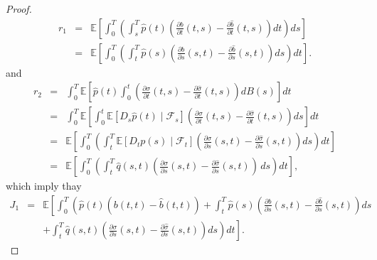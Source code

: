 \documentclass[12pt]{article}
\theoremstyle{remark}
\numberwithin{equation}{section}
\def\E{\mathbb E}
\def\E{\mathbb E}
\begin{document}
\begin{proof}
\begin{eqnarray}\label{Eq003}
	r_1 &=&\mathbb{E}\left[ \int_0^T \left( \int_s^T \hat{p}(t) \left(\frac{\partial
		b}{\partial t }(t, s) -\frac{\partial
		\hat{b}}{\partial t }(t, s)\right)dt\right)ds\right]\nonumber\\
	&=& \mathbb{E}\left[ \int_0^T \left( \int_t^T \hat{p}(s) \left(\frac{\partial
		b}{\partial s }(s,t)-\frac{\partial
		\hat{b}}{\partial s }(s, t)\right)ds\right)dt\right]\nonumber. 	
\end{eqnarray}
and
\begin{eqnarray*}
	r_2 &=&\int_0^T \mathbb{E}\left[ \hat{p}(t)\int_0^t  \left(\frac{\partial \sigma}{\partial t }(t, s)-\frac{\partial \hat{\sigma}}{\partial t }(t, s)\right)dB(s)\right] dt\\
	&=&\int_0^T \mathbb{E} \left[ \int_0^t \mathbb{E}\left[ D_s \hat{p}(t) \mid \mathcal{F}_s \right]\left(\frac{\partial \sigma}{\partial t}(t, s)-\frac{\partial \hat{\sigma}}{\partial t}(t, s)\right)ds \right] dt\\
	&=& \mathbb{E}\left[\int_0^T \left( \int_t^T \mathbb{E}\left[ D_t p(s) \mid \mathcal{F}_t \right]\left(\frac{\partial \sigma}{\partial s}(s, t)-\frac{\partial \hat{\sigma}}{\partial s }(s, t)\right)ds \right) dt\right]\nonumber\\
&=&	\mathbb{E}\left[\int_0^T \left( \int_t^T \hat{q}(s,t)\left( \frac{\partial \sigma}{\partial s }(s, t)-\frac{\partial \hat{\sigma}}{\partial s }(s, t)\right) \,ds \right) dt\right],
\end{eqnarray*}
which imply thay
\begin{eqnarray}\label{Eq0021}
J_1&=&\E\left[\int_0^T\left(\hat{p}(t)\left(b(t,t)-\hat{b}(t,t)\right)+\int_t^T \hat{p}(s)\left(\frac{\partial b}{\partial s }(s,t)-\frac{\partial \hat{b}}{\partial s }(s, t)\right)ds\right.\right.\nonumber\\
&&+\left.\left.\int_t^T \hat{q}(s,t)\left( \frac{\partial \sigma}{\partial s }(s, t)-\frac{\partial \hat{\sigma}}{\partial s }(s, t)\right)ds \right)dt\right].
\end{eqnarray}


\end{proof}
\end{document}
